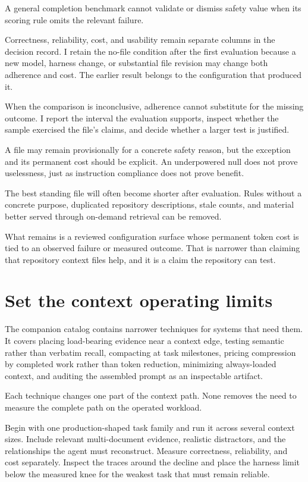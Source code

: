 A general completion benchmark cannot validate or dismiss safety value when its scoring rule omits the relevant failure.

Correctness, reliability, cost, and usability remain separate columns in the decision record. I retain the no-file condition after the first evaluation because a new model, harness change, or substantial file revision may change both adherence and cost. The earlier result belongs to the configuration that produced it.

When the comparison is inconclusive, adherence cannot substitute for the missing outcome. I report the interval the evaluation supports, inspect whether the sample exercised the file's claims, and decide whether a larger test is justified.

A file may remain provisionally for a concrete safety reason, but the exception and its permanent cost should be explicit. An underpowered null does not prove uselessness, just as instruction compliance does not prove benefit.

The best standing file will often become shorter after evaluation. Rules without a concrete purpose, duplicated repository descriptions, stale counts, and material better served through on-demand retrieval can be removed.

What remains is a reviewed configuration surface whose permanent token cost is tied to an observed failure or measured outcome. That is narrower than claiming that repository context files help, and it is a claim the repository can test.

\hypertarget{set-the-context-operating-limits}{%
\section{Set the context operating limits}\label{set-the-context-operating-limits}}

The companion catalog contains narrower techniques for systems that need them. It covers placing load-bearing evidence near a context edge, testing semantic rather than verbatim recall, compacting at task milestones, pricing compression by completed work rather than token reduction, minimizing always-loaded context, and auditing the assembled prompt as an inspectable artifact.

Each technique changes one part of the context path. None removes the need to measure the complete path on the operated workload.

Begin with one production-shaped task family and run it across several context sizes. Include relevant multi-document evidence, realistic distractors, and the relationships the agent must reconstruct. Measure correctness, reliability, and cost separately. Inspect the traces around the decline and place the harness limit below the measured knee for the weakest task that must remain reliable.

